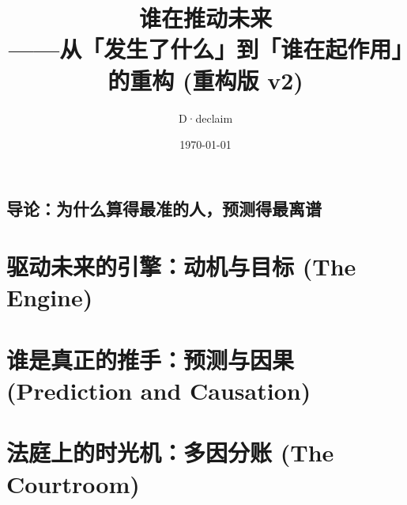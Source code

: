 \documentclass[openany, a4paper, 12pt]{book}
\title{\textbf{谁在推动未来}\\ \large ——从「发生了什么」到「谁在起作用」的重构 (重构版 v2)}
\author{D·declaim}
\date{\today}
\begin{document}
\maketitle

\frontmatter

\tableofcontents

\mainmatter

\chapter*{导论：为什么算得最准的人，预测得最离谱}


\part{驱动未来的引擎：动机与目标 (The Engine)}



\part{谁是真正的推手：预测与因果 (Prediction and Causation)}



\part{法庭上的时光机：多因分账 (The Courtroom)}


\end{document}
